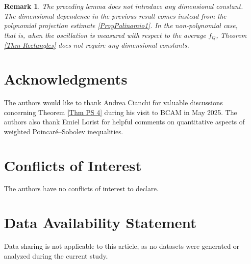\documentclass[reqno, 10pt, oneside]{amsart}
\numberwithin{equation}{section}
\newtheorem{remark}[theorem]{Remark}
\numberwithin{theorem}{section}
\newcommand{\1}{{\rm 1\hspace*{-0.4ex}%
\rule{0.1ex}{1.52ex}\hspace*{0.2ex}}}
\begin{document}
	\begin{remark}
	The preceding lemma does not introduce any dimensional constant. The dimensional dependence in the previous result comes instead from the polynomial projection estimate \eqref{ProyPolinomio1}.  In the non-polynomial case, that is, when the oscillation is measured with respect to the average $f_Q$, Theorem \ref{Thm Rectangles} does not require any dimensional constants.
\end{remark}
	


\section*{Acknowledgments}
 The authors would like to thank Andrea Cianchi for valuable discussions concerning Theorem \ref{Thm PS 4} during his visit to BCAM in May 2025. The authors also thank Emiel Lorist for helpful comments on quantitative aspects of weighted Poincaré--Sobolev inequalities.


\section*{Conflicts of Interest}
The authors have no conflicts of interest to declare.

\section*{Data Availability Statement}
Data sharing is not applicable to this article, as no datasets were generated or analyzed during the current study.




\end{document}
